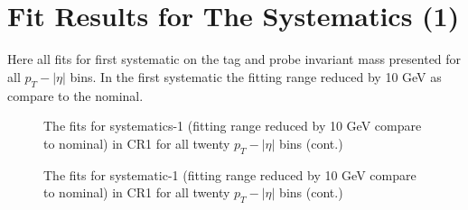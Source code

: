 
\chapter{Fit Results for The Systematics (1)} %

\label{AppendixB} %

Here all fits for first systematic on the tag and probe invariant mass presented for all $p_T-|\eta|$ bins. In the first systematic the fitting range reduced by 10 GeV as compare to the nominal.

\begin{figure}[H]
\begin{center}
\scalebox{0.35}{}\scalebox{0.35}{}
\scalebox{0.35}{}\scalebox{0.35}{}
\caption{The fits for systematics-1 (fitting range reduced by 10 GeV compare to nominal) in CR1 for all twenty $p_T-|\eta|$ bins (cont.)}
\label{fig:fit_cr1_sys1}
\end{center}
\end{figure}

\begin{figure}[H]
\begin{center}
\scalebox{0.35}{}\scalebox{0.35}{}
\scalebox{0.35}{}\scalebox{0.35}{}
\scalebox{0.35}{}\scalebox{0.35}{}
\scalebox{0.35}{}\scalebox{0.35}{}
\caption{The fits for systematic-1 (fitting range reduced by 10 GeV compare to nominal) in CR1 for all twenty $p_T-|\eta|$ bins (cont.)}
\label{fig:fit_cr1_sys1}
\end{center}
\end{figure}


